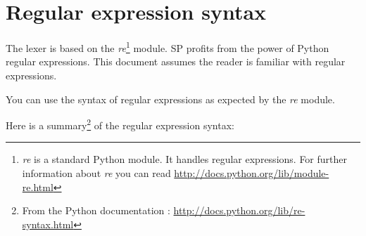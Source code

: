 %
%
%

\section{Regular expression syntax}

The lexer is based on the \emph{re}\footnote{\emph{re} is a standard Python module. It handles regular expressions. For further information about \emph{re} you can read \url{http://docs.python.org/lib/module-re.html}} module.
SP profits from the power of Python regular expressions.
This document assumes the reader is familiar with regular expressions.

You can use the syntax of regular expressions as expected by the \emph{re} module.

Here is a summary\footnote{From the Python documentation : \url{http://docs.python.org/lib/re-syntax.html}} of the regular expression syntax:

